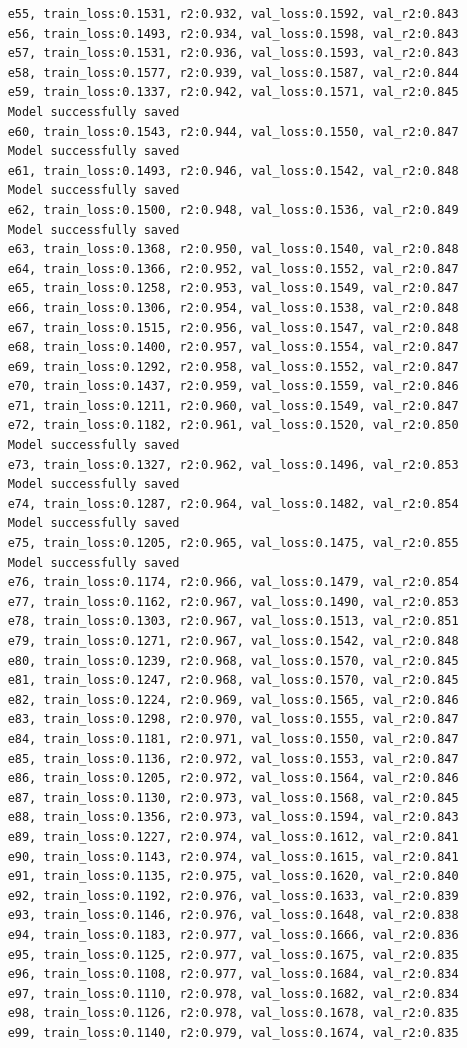 \documentclass[a4paper, 12pt]{article}
\begin{document}
\begin{lstlisting}
	e55, train_loss:0.1531, r2:0.932, val_loss:0.1592, val_r2:0.843
	e56, train_loss:0.1493, r2:0.934, val_loss:0.1598, val_r2:0.843
	e57, train_loss:0.1531, r2:0.936, val_loss:0.1593, val_r2:0.843
	e58, train_loss:0.1577, r2:0.939, val_loss:0.1587, val_r2:0.844
	e59, train_loss:0.1337, r2:0.942, val_loss:0.1571, val_r2:0.845
	Model successfully saved
	e60, train_loss:0.1543, r2:0.944, val_loss:0.1550, val_r2:0.847
	Model successfully saved
	e61, train_loss:0.1493, r2:0.946, val_loss:0.1542, val_r2:0.848
	Model successfully saved
	e62, train_loss:0.1500, r2:0.948, val_loss:0.1536, val_r2:0.849
	Model successfully saved
	e63, train_loss:0.1368, r2:0.950, val_loss:0.1540, val_r2:0.848
	e64, train_loss:0.1366, r2:0.952, val_loss:0.1552, val_r2:0.847
	e65, train_loss:0.1258, r2:0.953, val_loss:0.1549, val_r2:0.847
	e66, train_loss:0.1306, r2:0.954, val_loss:0.1538, val_r2:0.848
	e67, train_loss:0.1515, r2:0.956, val_loss:0.1547, val_r2:0.848
	e68, train_loss:0.1400, r2:0.957, val_loss:0.1554, val_r2:0.847
	e69, train_loss:0.1292, r2:0.958, val_loss:0.1552, val_r2:0.847
	e70, train_loss:0.1437, r2:0.959, val_loss:0.1559, val_r2:0.846
	e71, train_loss:0.1211, r2:0.960, val_loss:0.1549, val_r2:0.847
	e72, train_loss:0.1182, r2:0.961, val_loss:0.1520, val_r2:0.850
	Model successfully saved
	e73, train_loss:0.1327, r2:0.962, val_loss:0.1496, val_r2:0.853
	Model successfully saved
	e74, train_loss:0.1287, r2:0.964, val_loss:0.1482, val_r2:0.854
	Model successfully saved
	e75, train_loss:0.1205, r2:0.965, val_loss:0.1475, val_r2:0.855
	Model successfully saved
	e76, train_loss:0.1174, r2:0.966, val_loss:0.1479, val_r2:0.854
	e77, train_loss:0.1162, r2:0.967, val_loss:0.1490, val_r2:0.853
	e78, train_loss:0.1303, r2:0.967, val_loss:0.1513, val_r2:0.851
	e79, train_loss:0.1271, r2:0.967, val_loss:0.1542, val_r2:0.848
	e80, train_loss:0.1239, r2:0.968, val_loss:0.1570, val_r2:0.845
	e81, train_loss:0.1247, r2:0.968, val_loss:0.1570, val_r2:0.845
	e82, train_loss:0.1224, r2:0.969, val_loss:0.1565, val_r2:0.846
	e83, train_loss:0.1298, r2:0.970, val_loss:0.1555, val_r2:0.847
	e84, train_loss:0.1181, r2:0.971, val_loss:0.1550, val_r2:0.847
	e85, train_loss:0.1136, r2:0.972, val_loss:0.1553, val_r2:0.847
	e86, train_loss:0.1205, r2:0.972, val_loss:0.1564, val_r2:0.846
	e87, train_loss:0.1130, r2:0.973, val_loss:0.1568, val_r2:0.845
	e88, train_loss:0.1356, r2:0.973, val_loss:0.1594, val_r2:0.843
	e89, train_loss:0.1227, r2:0.974, val_loss:0.1612, val_r2:0.841
	e90, train_loss:0.1143, r2:0.974, val_loss:0.1615, val_r2:0.841
	e91, train_loss:0.1135, r2:0.975, val_loss:0.1620, val_r2:0.840
	e92, train_loss:0.1192, r2:0.976, val_loss:0.1633, val_r2:0.839
	e93, train_loss:0.1146, r2:0.976, val_loss:0.1648, val_r2:0.838
	e94, train_loss:0.1183, r2:0.977, val_loss:0.1666, val_r2:0.836
	e95, train_loss:0.1125, r2:0.977, val_loss:0.1675, val_r2:0.835
	e96, train_loss:0.1108, r2:0.977, val_loss:0.1684, val_r2:0.834
	e97, train_loss:0.1110, r2:0.978, val_loss:0.1682, val_r2:0.834
	e98, train_loss:0.1126, r2:0.978, val_loss:0.1678, val_r2:0.835
	e99, train_loss:0.1140, r2:0.979, val_loss:0.1674, val_r2:0.835	
		
	\end{lstlisting}	
	
\end{document}
